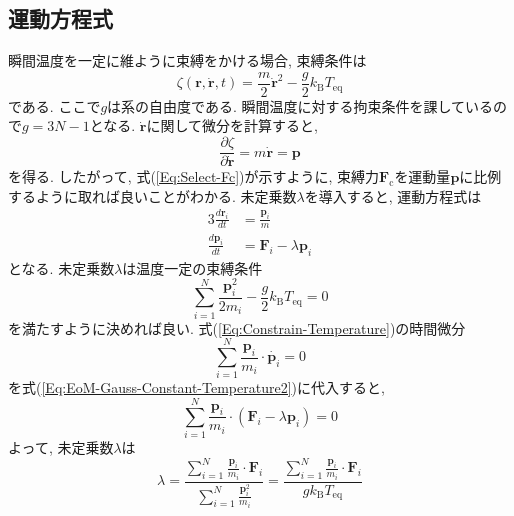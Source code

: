 \subsection{運動方程式}

瞬間温度を一定に維ように束縛をかける場合, 束縛条件は
\begin{equation}
    \zeta(\bm{r}, \dot{\bm{r}}, t)
    =
    \frac{m}{2}\dot{\bm{r}}^{2}
    -
    \frac{g}{2} k_{\mathrm{B}} T_{\mathrm{eq}}
\end{equation}
である.
ここで$g$は系の自由度である.
瞬間温度に対する拘束条件を課しているので$g = 3N - 1$となる.
$\dot{\bm{r}}$に関して微分を計算すると,
\begin{equation}
    \frac{\partial \zeta}{\partial \dot{\bm{r}}}
    =
    m \dot{\bm{r}}
    =
    \bm{p}
\end{equation}
を得る.
したがって, 式(\ref{Eq:Select-Fc})が示すように, 束縛力$\bm{F}_{\mathrm{c}}$を運動量$\bm{p}$に比例するように取れば良いことがわかる.
未定乗数$\lambda$を導入すると, 運動方程式は
\begin{alignat}{3}
    \frac{d \bm{r}_{i}}{dt}
    &=
    \frac{\bm{p}_{i}}{m}
    \label{Eq:EoM-Gauss-Constant-Temperature1}
    \\
    \frac{d \bm{p}_{i}}{dt}
    &=
    \bm{F}_{i} - \lambda \bm{p}_{i}
    \label{Eq:EoM-Gauss-Constant-Temperature2}
\end{alignat}
となる.
未定乗数$\lambda$は温度一定の束縛条件
\begin{equation}
    \sum_{i=1}^{N}
    \frac{\bm{p}_{i}^{2}}{2m_{i}}
    -
    \frac{g}{2} k_{\mathrm{B}} T_{\mathrm{eq}}
    =
    0
    \label{Eq:Constrain-Temperature}
\end{equation}
を満たすように決めれば良い.
式(\ref{Eq:Constrain-Temperature})の時間微分
\begin{equation}
    \sum_{i=1}^{N}
    \frac{\bm{p}_{i}}{m_{i}} \cdot \dot{\bm{p}_{i}}
    =
    0
\end{equation}
を式(\ref{Eq:EoM-Gauss-Constant-Temperature2})に代入すると,
\begin{equation}
    \sum_{i=1}^{N}
    \frac{\bm{p}_{i}}{m_{i}}
    \cdot
    \left( \bm{F}_{i} - \lambda \bm{p}_{i}\right)
    =
    0
\end{equation}
よって, 未定乗数$\lambda$は
\begin{equation}
    \lambda
    =
    \frac
    {\sum_{i=1}^{N} \frac{\bm{p}_{i}}{m_{i}} \cdot \bm{F}_{i}}
    {\sum_{i=1}^{N} \frac{\bm{p}_{i}^{2}}{m_{i}}}
    =
    \frac
    {\sum_{i=1}^{N} \frac{\bm{p}_{i}}{m_{i}} \cdot \bm{F}_{i}}
    {g k_{\mathrm{B}} T_{\mathrm{eq}}}
    \label{Eq:EoM-Gauss-Constant-Temperature-Lambda}
\end{equation}
